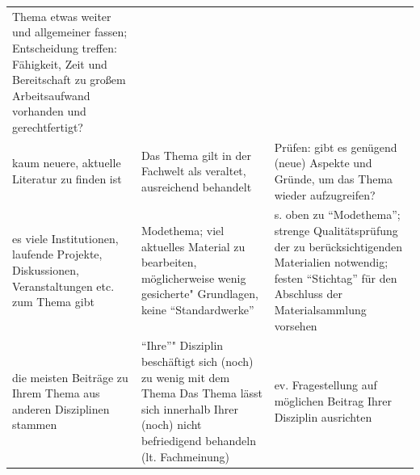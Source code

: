 \documentclass[]{book}
\theoremstyle{definition}
\theoremstyle{definition}
\theoremstyle{definition}
\theoremstyle{remark}
\begin{document}
\begin{longtable}[]{@{}lll@{}}
\begin{minipage}[t]{0.30\columnwidth}
Thema etwas weiter und allgemeiner fassen; Entscheidung treffen:
Fähigkeit, Zeit und Bereitschaft zu großem Arbeitsaufwand vorhanden und
gerechtfertigt?\vspace{5mm}\strut
\end{minipage}\tabularnewline
\begin{minipage}[t]{0.31\columnwidth}\raggedright\strut
kaum neuere, aktuelle Literatur zu finden ist\strut
\end{minipage} & \begin{minipage}[t]{0.30\columnwidth}\raggedright\strut
Das Thema gilt in der Fachwelt als veraltet, ausreichend behandelt\strut
\end{minipage} & \begin{minipage}[t]{0.30\columnwidth}\raggedright\strut
Prüfen: gibt es genügend (neue) Aspekte und Gründe, um das Thema wieder
aufzugreifen?\vspace{5mm}\strut
\end{minipage}\tabularnewline
\begin{minipage}[t]{0.31\columnwidth}\raggedright\strut
es viele Institutionen, laufende Projekte, Diskussionen, Veranstaltungen
etc. zum Thema gibt\strut
\end{minipage} & \begin{minipage}[t]{0.30\columnwidth}\raggedright\strut
Modethema; viel aktuelles Material zu bearbeiten, möglicherweise wenig
gesicherte" Grundlagen, keine ``Standardwerke''\strut
\end{minipage} & \begin{minipage}[t]{0.30\columnwidth}\raggedright\strut
s. oben zu ``Modethema''; strenge Qualitätsprüfung der zu
berücksichtigenden Materialien notwendig; festen ``Stichtag'' für den
Abschluss der Materialsammlung vorsehen\vspace{5mm}\strut
\end{minipage}\tabularnewline
\begin{minipage}[t]{0.31\columnwidth}\raggedright\strut
die meisten Beiträge zu Ihrem Thema aus anderen Disziplinen
stammen\strut
\end{minipage} & \begin{minipage}[t]{0.30\columnwidth}\raggedright\strut
``Ihre''" Disziplin beschäftigt sich (noch) zu wenig mit dem Thema Das
Thema lässt sich innerhalb Ihrer (noch) nicht befriedigend behandeln
(lt. Fachmeinung)\strut
\end{minipage} & \begin{minipage}[t]{0.30\columnwidth}\raggedright\strut
ev. Fragestellung auf möglichen Beitrag Ihrer Disziplin ausrichten

\end{minipage}
\end{longtable}
\end{document}
